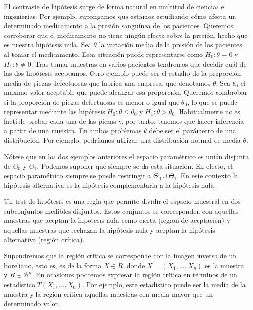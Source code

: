     El contraste de hipótesis surge de forma natural en multitud de ciencias e ingenierías. Por ejemplo, supongamos que estamos estudiando cómo afecta un determinado medicamento a la presión sanguínea de los pacientes. Queremos corroborar que el medicamento no tiene ningún efecto sobre la presión, hecho que es nuestra hipótesis nula. Sea $\theta$ la variación media de la presión de los pacientes al tomar el medicamento. Esta situación puede representarse como $H_0: \theta = 0$ y $H_1: \theta \ne 0$. Tras tomar muestras en varios pacientes tendremos que decidir cuál de las dos hipótesis aceptamos. Otro ejemplo puede ser el estudio de la proporción media de piezas defectuosas que fabrica una empresa, que denotamos $\theta$. Sea $\theta_0$ el máximo valor aceptable que puede alcanzar esa proporción. Queremos combrobar si la proporción de piezas defectuosas es menor o igual que $\theta_0$, lo que se puede representar mediante las hipótesis $H_0: \theta \le \theta_0$ y $H_1: \theta > \theta_0$. Habitualmente no es factible probar cada una de las piezas y, por tanto, tenemos que hacer inferencia a partir de una muestra. En ambos problemas $\theta$ debe ser el parámetro de una distribución. Por ejemplo, podríamos utilizar una distribución normal de media $\theta$.

    Nótese que en los dos ejemplos anteriores el espacio paramétrico es unión disjunta de $\Theta_0$ y $\Theta_1$. Podemos suponer que siempre se da esta situación. En efecto, el espacio paramétrico siempre se puede restringir a $\Theta_0 \cup \Theta_1$. En este contexto la hipótesis alternativa es la hipótesis complementaria a la hipótesis nula.

    \begin{definition}
        Un test de hipótesis es una regla que permite dividir el espacio muestral en dos subconjuntos medibles disjuntos. Estos conjuntos se corresponden con aquellas muestras que aceptan la hipótesis nula como cierta (región de aceptación) y aquellas muestras que rechazan la hipótesis nula y aceptan la hipótesis alternativa (región crítica).
    \end{definition}

    Supondremos que la región crítica se corresponde con la imagen inversa de un boreliano, esto es, es de la forma $X \in R$, donde $X = (X_1, \ldots, X_n)$ es la muestra y $R \in \mathcal{B}^n$. En ocasiones podremos expresar la región crítica en términos de un estadístico $T(X_1, \ldots, X_n)$. Por ejemplo, este estadístico puede ser la media de la muestra y la región crítica aquellas muestras con media mayor que un determinado valor.

